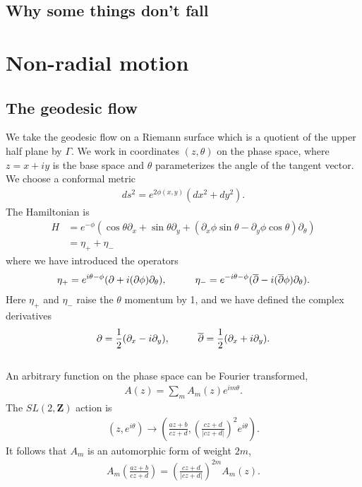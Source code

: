 \documentclass[JHEP,12pt]{article}
\begin{document}
\subsection{Why some things don't fall}
\section{Non-radial motion}
\subsection{The geodesic flow}
We take the geodesic flow on a Riemann surface which is a quotient of the upper half plane by $\Gamma$. We work in coordinates $(z,\theta)$ on the phase space, where $z=x+iy$ is the base space and $\theta$ parameterizes the angle of the tangent vector. We choose a conformal metric 
\begin{align}
ds^2=e^{2\phi(x,y)}(dx^2+dy^2).
\end{align}
The Hamiltonian is 
\begin{align}
H&=e^{-\phi}(\cos\theta \partial_x+\sin\theta\partial_y+(\partial_x\phi \sin\theta-\partial_y\phi\cos\theta)\partial_\theta)\\
&=\eta_{+}+\eta_-
\end{align}
where we have introduced the operators
\begin{align}
\eta_+=e^{i\theta-\phi}(\partial+i(\partial\phi)\partial_\theta),\hspace{10 mm}\eta_-=e^{-i\theta-\phi}(\overline{\partial}-i(\overline{\partial}\phi)\partial_\theta).
\end{align}
Here $\eta_+$ and $\eta_-$ raise the $\theta$ momentum by 1, and we have defined the complex derivatives 
\begin{align}
\partial=\frac{1}{2}(\partial_x-i\partial_y),\hspace{10 mm}\overline{\partial}=\frac{1}{2}(\partial_x+i\partial_y).
\end{align}\\
\indent An arbitrary function on the phase space can be Fourier transformed,
\begin{align}
A(z)=\sum_m A_m(z)e^{im\theta}.
\end{align}
The $SL(2,\mathbf{Z})$ action is 
\begin{align}
(z,e^{i\theta})\to \left(\frac{az+b}{cz+d},\left(\frac{cz+d}{|cz+d|}\right)^{2}e^{i\theta}\right).
\end{align}
It follows that $A_m$ is an automorphic form of weight $2m$,
\begin{align}
A_m\left(\frac{az+b}{cz+d}\right)=\left(\frac{cz+d}{|cz+d|}\right)^{2m}A_m(z).
\end{align}
\end{document}
